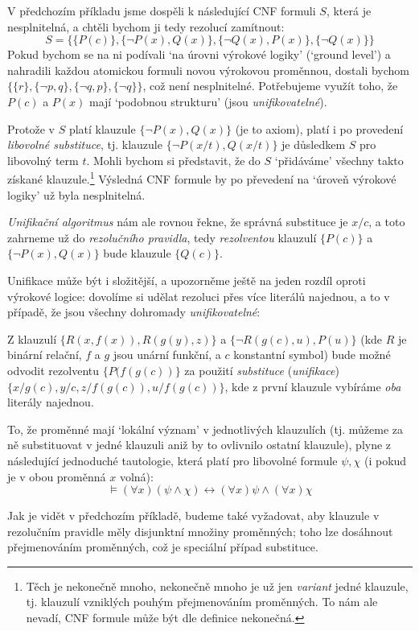\begin{example}
    V předchozím příkladu jsme dospěli k následující CNF formuli $S$, která je nesplnitelná, a chtěli bychom ji tedy rezolucí zamítnout:
    $$
    S = \{\{P(c)\},\{\neg P(x),Q(x)\},\{\neg Q(x),P(x)\},\{\neg Q(x)\}\}
    $$
    Pokud bychom se na ni podívali `na úrovni výrokové logiky' (`ground level') a nahradili každou atomickou formuli novou výrokovou proměnnou, dostali bychom $\{\{r\},\{\neg p,q\},\{\neg q,p\},\{\neg q\}\}$, což není nesplnitelné. Potřebujeme využít toho, že $P(c)$ a $P(x)$ mají `podobnou strukturu' (jsou \emph{unifikovatelné}).

    Protože v $S$ platí klauzule $\{\neg P(x),Q(x)\}$ (je to axiom), platí i po provedení \emph{libovolné substituce}, tj. klauzule $\{\neg P(x/t),Q(x/t)\}$ je důsledkem $S$ pro libovolný term $t$. Mohli bychom si představit, že do  $S$ `přidáváme' všechny takto získané klauzule.\footnote{Těch je nekonečně mnoho, nekonečně mnoho je už jen \emph{variant} jedné klauzule, tj. klauzulí vzniklých pouhým přejmenováním proměnných. To nám ale nevadí, CNF formule může být dle definice nekonečná.} Výsledná CNF formule by po převedení na `úroveň výrokové logiky' už byla nesplnitelná.

    \emph{Unifikační algoritmus} nám ale rovnou řekne, že správná substituce je $x/c$, a toto zahrneme už do \emph{rezolučního pravidla}, tedy \emph{rezolventou} klauzulí $\{P(c)\}$ a $\{\neg P(x),Q(x)\}$ bude klauzule $\{Q(c)\}$.
\end{example}

Unifikace může být i složitější, a upozorněme ještě na jeden rozdíl oproti výrokové logice: dovolíme si udělat rezoluci přes více literálů najednou, a to v případě, že jsou všechny dohromady \emph{unifikovatelné}:

\begin{example}
    Z klauzulí $\{R(x,f(x)),R(g(y),z)\}$ a $\{\neg R(g(c),u),P(u)\}$ (kde $R$ je binární relační, $f$ a $g$ jsou unární funkční, a $c$ konstantní symbol) bude možné odvodit rezolventu $\{P(f(g(c))\}$ za použití \emph{substituce} (\emph{unifikace}) $\{x/g(c),y/c,z/f(g(c)),u/f(g(c))\}$, kde z první klauzule vybíráme \emph{oba} literály najednou.
\end{example}

\begin{remark}
    To, že proměnné mají `lokální význam' v jednotlivých klauzulích (tj. můžeme za ně substituovat v jedné klauzuli aniž by to ovlivnilo ostatní klauzule), plyne z následující jednoduché tautologie, která platí pro libovolné formule $\psi,\chi$ (i pokud je v obou proměnná $x$ volná):
    $$
    \models(\forall x)(\psi \land \chi) \leftrightarrow (\forall x)\psi \land (\forall x)\chi
    $$

    Jak je vidět v předchozím příkladě, budeme také vyžadovat, aby klauzule v rezolučním pravidle měly disjunktní množiny proměnných; toho lze dosáhnout přejmenováním proměnných, což je speciální případ substituce.
\end{remark}



